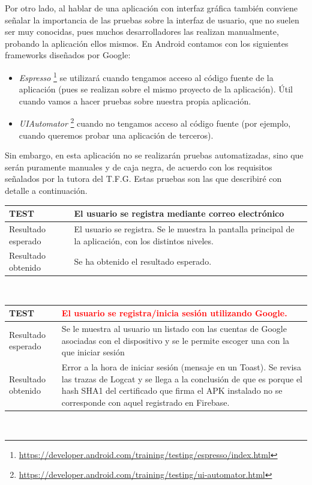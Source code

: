 \documentclass[twoside]{report}
\newcommand\addrow[2]{#1 &#2\\ }
\newcommand\addheading[2]{#1 &#2\\ \hline}
\newcommand\tabularhead{\begin{tabular}{lp{0.7\textwidth}}
\hline
}
\newenvironment{test}{\tabularhead}
{\hline\end{tabular}}
\begin{document}
Por otro lado, al hablar de una aplicación con interfaz gráfica también conviene señalar la importancia de las pruebas sobre la interfaz de usuario, que no suelen ser muy conocidas, pues muchos desarrolladores las realizan manualmente, probando la aplicación ellos mismos. En Android contamos con los siguientes frameworks diseñados por Google:

\begin{itemize}
\item \textit{Espresso} \footnote{\url{https://developer.android.com/training/testing/espresso/index.html}} se utilizará cuando tengamos acceso al código fuente de la aplicación (pues se realizan sobre el mismo proyecto de la aplicación). Útil cuando vamos a hacer pruebas sobre nuestra propia aplicación.

\item \textit{UIAutomator} \footnote{\url{https://developer.android.com/training/testing/ui-automator.html}} cuando no tengamos acceso al código fuente (por ejemplo, cuando queremos probar una aplicación de terceros).

\end{itemize}


Sin embargo, en esta aplicación no se realizarán pruebas automatizadas, sino que serán puramente manuales y de caja negra, de acuerdo con los requisitos señalados por la tutora del T.F.G. Estas pruebas son las que describiré con detalle a continuación.

\vspace{1cm}

\begin{test}
  \addheading{\textbf{TEST\arabic{test}}}{El usuario se registra mediante correo electrónico} 
  \addrow{Resultado esperado}{El usuario se registra. Se le muestra la pantalla principal de la aplicación, con los distintos niveles.}
  \addrow{Resultado obtenido}{Se ha obtenido el resultado esperado.}
\end{test}\\

\vspace{0.5cm}

\begin{test}
  \addheading{\textbf{TEST\arabic{test}}}{\textcolor{red}{El usuario se registra/inicia sesión utilizando Google.}} 
  \addrow{Resultado esperado}{Se le muestra al usuario un listado con las cuentas de Google asociadas con el dispositivo y se le permite escoger una con la que iniciar sesión}
  \addrow{Resultado obtenido}{Error a la hora de iniciar sesión (mensaje en un Toast). Se revisa las trazas de Logcat y se llega a la conclusión de que es porque el hash SHA1 del certificado que firma el APK instalado no se corresponde con aquel registrado en Firebase.}
\end{test}\\
\end{document}
